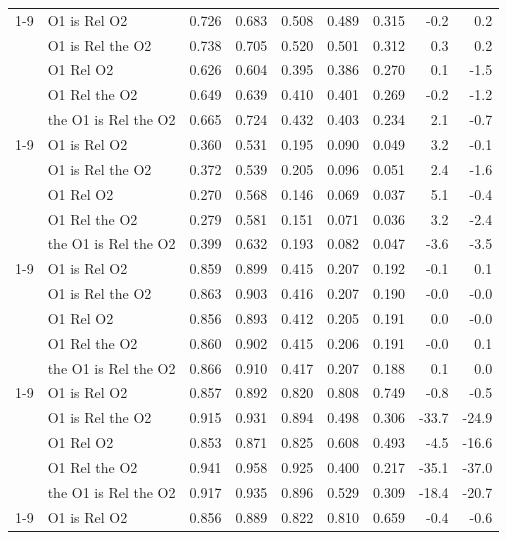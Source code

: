 \begin{table}[p]
\begin{tabular}{llrrrrrrr}
\cline{1-9}
\multirow[t]{5}{*}{RTE DiT-micro} & O1 is Rel O2 & 0.726 & 0.683 & 0.508 & 0.489 & 0.315 & -0.2 & 0.2 \\
 & O1 is Rel the O2 & 0.738 & 0.705 & 0.520 & 0.501 & 0.312 & 0.3 & 0.2 \\
 & O1 Rel O2 & 0.626 & 0.604 & 0.395 & 0.386 & 0.270 & 0.1 & -1.5 \\
 & O1 Rel the O2 & 0.649 & 0.639 & 0.410 & 0.401 & 0.269 & -0.2 & -1.2 \\
 & the O1 is Rel the O2 & 0.665 & 0.724 & 0.432 & 0.403 & 0.234 & 2.1 & -0.7 \\
\cline{1-9}
\multirow[t]{5}{*}{RTE DiT-nano} & O1 is Rel O2 & 0.360 & 0.531 & 0.195 & 0.090 & 0.049 & 3.2 & -0.1 \\
 & O1 is Rel the O2 & 0.372 & 0.539 & 0.205 & 0.096 & 0.051 & 2.4 & -1.6 \\
 & O1 Rel O2 & 0.270 & 0.568 & 0.146 & 0.069 & 0.037 & 5.1 & -0.4 \\
 & O1 Rel the O2 & 0.279 & 0.581 & 0.151 & 0.071 & 0.036 & 3.2 & -2.4 \\
 & the O1 is Rel the O2 & 0.399 & 0.632 & 0.193 & 0.082 & 0.047 & -3.6 & -3.5 \\
\cline{1-9}
\multirow[t]{5}{*}{RTE w/pos DiT-B} & O1 is Rel O2 & 0.859 & 0.899 & 0.415 & 0.207 & 0.192 & -0.1 & 0.1 \\
 & O1 is Rel the O2 & 0.863 & 0.903 & 0.416 & 0.207 & 0.190 & -0.0 & -0.0 \\
 & O1 Rel O2 & 0.856 & 0.893 & 0.412 & 0.205 & 0.191 & 0.0 & -0.0 \\
 & O1 Rel the O2 & 0.860 & 0.902 & 0.415 & 0.206 & 0.191 & -0.0 & 0.1 \\
 & the O1 is Rel the O2 & 0.866 & 0.910 & 0.417 & 0.207 & 0.188 & 0.1 & 0.0 \\
\cline{1-9}
\multirow[t]{5}{*}{T5 DiT-B} & O1 is Rel O2 & 0.857 & 0.892 & 0.820 & 0.808 & 0.749 & -0.8 & -0.5 \\
 & O1 is Rel the O2 & 0.915 & 0.931 & 0.894 & 0.498 & 0.306 & -33.7 & -24.9 \\
 & O1 Rel O2 & 0.853 & 0.871 & 0.825 & 0.608 & 0.493 & -4.5 & -16.6 \\
 & O1 Rel the O2 & 0.941 & 0.958 & 0.925 & 0.400 & 0.217 & -35.1 & -37.0 \\
 & the O1 is Rel the O2 & 0.917 & 0.935 & 0.896 & 0.529 & 0.309 & -18.4 & -20.7 \\
\cline{1-9}
\multirow[t]{5}{*}{T5 DiT-mini} & O1 is Rel O2 & 0.856 & 0.889 & 0.822 & 0.810 & 0.659 & -0.4 & -0.6 \\

\end{tabular}
\end{table}
